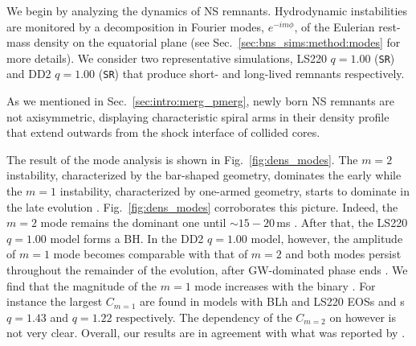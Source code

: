 We begin by analyzing the \pmerg{} dynamics of \ac{NS} remnants.
Hydrodynamic instabilities are monitored by a decomposition in Fourier modes,
$e^{-i m \phi}$, of the Eulerian rest-mass density on the equatorial plane 
(see Sec.~\ref{sec:bns_sims:method:modes} for more details).
%
%
We consider two representative simulations, 
LS220 $q=1.00$ (\texttt{SR}) %
and 
DD2 $q=1.00$ (\texttt{SR}) 
that produce short- and long-lived remnants respectively.

%
As we mentioned in Sec.~\ref{sec:intro:merg_pmerg}, 
newly born \ac{NS} remnants are not axisymmetric, 
displaying characteristic spiral arms in their density 
profile that extend outwards from the shock interface of collided cores. 
%
%

The result of the mode analysis is shown in Fig.~\ref{fig:dens_modes}. 
The $m=2$ instability, characterized by the bar-shaped geometry, dominates 
the early \pmerg{} while the $m=1$ instability, characterized by one-armed geometry,  
starts to dominate in the late evolution 
\citep[\eg][]{East:2015vix, %
    Bernuzzi:2013rza,Kastaun:2014fna}.
Fig.~\ref{fig:dens_modes} corroborates this picture.
%
%
Indeed, the $m=2$ mode remains the dominant one until 
${\sim}15-20\,$ms \pmerg{}. 
After that, the 
LS220 $q=1.00$ model 
forms a \ac{BH}. 
In the 
DD2 $q=1.00$ model, 
however, the amplitude of $m=1$ mode 
becomes comparable with that of $m=2$ and 
both modes persist throughout the remainder of the evolution,
after \ac{GW}-dominated phase ends 
\citep{Bernuzzi:2015opx,Radice:2016gym}. 
%
%
%
We find that the magnitude of the $m=1$ mode increases with the binary \mr{}.
For instance the largest $C_{m=1}$ are found in models with 
BLh and LS220 \acp{EOS} and \mr{}s $q=1.43$ and $q=1.22$ respectively. 
The dependency of the $C_{m=2}$ on \mr{} however is not very clear. 
Overall, our results are in agreement with what was 
reported by \citet{Lehner:2016wjg}.


